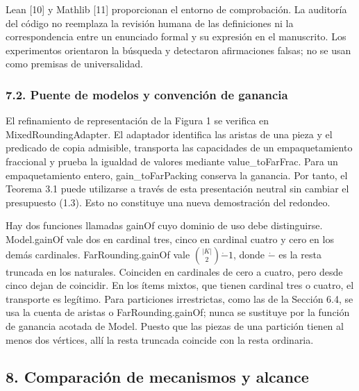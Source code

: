 \documentclass[spanish,11pt,a4paper]{article}
\begin{document}
Lean {[}10{]} y Mathlib {[}11{]} proporcionan el entorno de comprobación. La auditoría del código no reemplaza la revisión humana de las definiciones ni la correspondencia entre un enunciado formal y su expresión en el manuscrito. Los experimentos orientaron la búsqueda y detectaron afirmaciones falsas; no se usan como premisas de universalidad.

\subsubsection{7.2. Puente de modelos y convención de ganancia}\label{puente-de-modelos-y-convencion-de-ganancia}

El refinamiento de representación de la Figura 1 se verifica en {\ttfamily\small MixedRoundin\discretionary{\hbox{\ensuremath{\hookrightarrow}}}{}{}gAdapter}. El adaptador identifica las aristas de una pieza y el predicado de copia admisible, transporta las capacidades de un empaquetamiento fraccional y prueba la igualdad de valores mediante {\ttfamily\small value\_\discretionary{\hbox{\ensuremath{\hookrightarrow}}}{}{}toFarFrac}. Para un empaquetamiento entero, {\ttfamily\small gain\_\discretionary{\hbox{\ensuremath{\hookrightarrow}}}{}{}toFarPacking} conserva la ganancia. Por tanto, el Teorema 3.1 puede utilizarse a través de esta presentación neutral sin cambiar el presupuesto (1.3). Esto no constituye una nueva demostración del redondeo.

Hay dos funciones llamadas {\ttfamily\small gainOf} cuyo dominio de uso debe distinguirse. {\ttfamily\small Model.\discretionary{\hbox{\ensuremath{\hookrightarrow}}}{}{}gainOf} vale dos en cardinal tres, cinco en cardinal cuatro y cero en los demás cardinales. {\ttfamily\small FarRounding.\discretionary{\hbox{\ensuremath{\hookrightarrow}}}{}{}gainOf} vale \(\binom{|K|}{2}\mathbin{\dot-}1\), donde \(\dot-\) es la resta truncada en los naturales. Coinciden en cardinales de cero a cuatro, pero desde cinco dejan de coincidir. En los ítems mixtos, que tienen cardinal tres o cuatro, el transporte es legítimo. Para particiones irrestrictas, como las de la Sección 6.4, se usa la cuenta de aristas o {\ttfamily\small FarRounding.\discretionary{\hbox{\ensuremath{\hookrightarrow}}}{}{}gainOf}; nunca se sustituye por la función de ganancia acotada de Model. Puesto que las piezas de una partición tienen al menos dos vértices, allí la resta truncada coincide con la resta ordinaria.

\subsection{8. Comparación de mecanismos y alcance}\label{comparacion-de-mecanismos-y-alcance}
\end{document}
